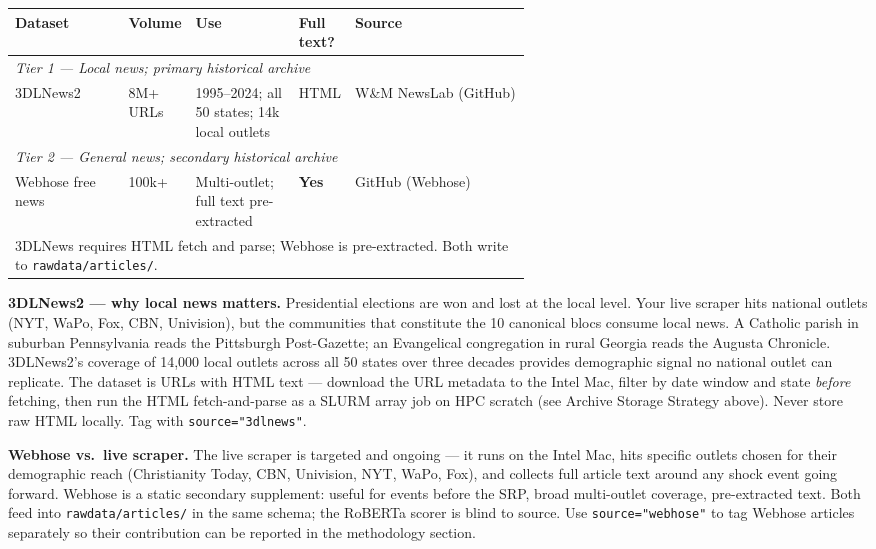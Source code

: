 \documentclass[11pt]{article}
\begin{document}
\begin{center}
\begin{tabularx}{\linewidth}{p{0.22\linewidth}p{0.09\linewidth}p{0.20\linewidth}p{0.09\linewidth}X}
\toprule
\textbf{Dataset} & \textbf{Volume} & \textbf{Use} & \textbf{Full text?} & \textbf{Source} \\
\midrule
\multicolumn{5}{l}{\small\textit{Tier 1 --- Local news; primary historical archive}} \\[2pt]
3DLNews2 & 8M+ URLs & 1995--2024; all 50 states; 14k local outlets & HTML & W\&M NewsLab (GitHub) \\[4pt]
\multicolumn{5}{l}{\small\textit{Tier 2 --- General news; secondary historical archive}} \\[2pt]
Webhose free news & 100k+ & Multi-outlet; full text pre-extracted & \textbf{Yes} & GitHub (Webhose) \\
\bottomrule
\multicolumn{5}{l}{\small 3DLNews requires HTML fetch and parse; Webhose is pre-extracted. Both write to \texttt{rawdata/articles/}.} \\
\end{tabularx}
\end{center}

\medskip
\noindent\textbf{3DLNews2 --- why local news matters.}
Presidential elections are won and lost at the local level. Your live scraper
hits national outlets (NYT, WaPo, Fox, CBN, Univision), but the communities
that constitute the 10 canonical blocs consume local news. A Catholic
parish in suburban Pennsylvania reads the Pittsburgh Post-Gazette; an
Evangelical congregation in rural Georgia reads the Augusta Chronicle.
3DLNews2's coverage of 14,000 local outlets across all 50 states over
three decades provides demographic signal no national outlet can replicate.
The dataset is URLs with HTML text --- download the URL metadata to the
Intel Mac, filter by date window and state \emph{before} fetching, then
run the HTML fetch-and-parse as a SLURM array job on HPC scratch (see
Archive Storage Strategy above). Never store raw HTML locally.
Tag with \texttt{source="3dlnews"}.

\medskip
\noindent\textbf{Webhose vs.\ live scraper.} The live scraper is targeted and ongoing
--- it runs on the Intel Mac, hits specific outlets chosen for their
demographic reach (Christianity Today, CBN, Univision, NYT, WaPo, Fox), and collects
full article text around any shock event going forward. Webhose is a static secondary
supplement: useful for events before the SRP, broad multi-outlet coverage, pre-extracted
text. Both feed into \texttt{rawdata/articles/} in the same schema;
the RoBERTa scorer is blind to source. Use \texttt{source="webhose"} to tag Webhose
articles separately so their contribution can be reported in the methodology section.
\end{document}
